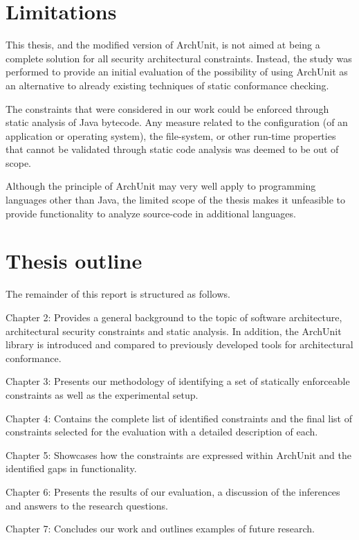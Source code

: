 \section{Limitations}
\label{sec:limitations}

This thesis, and the modified version of ArchUnit, is not aimed at being a complete solution for all security architectural constraints. Instead, the study was performed to provide an initial evaluation of the possibility of using ArchUnit as an alternative to already existing techniques of static conformance checking. 

The constraints that were considered in our work could be enforced through static analysis of Java bytecode. Any measure related to the configuration (of an application or operating system), the file-system, or other run-time properties that cannot be validated through static code analysis was deemed to be out of scope. 

Although the principle of ArchUnit may very well apply to programming languages other than Java, the limited scope of the thesis makes it unfeasible to provide functionality to analyze source-code in additional languages.

\section{Thesis outline}

The remainder of this report is structured as follows.

Chapter 2: Provides a general background to the topic of software architecture, architectural security constraints and static analysis. In addition, the ArchUnit library is introduced and compared to previously developed tools for architectural conformance.  

Chapter 3: Presents our methodology of identifying a set of statically enforceable constraints as well as the experimental setup. 

Chapter 4: Contains the complete list of identified constraints and the final list of constraints selected for the evaluation with a detailed description of each. 

Chapter 5: Showcases how the constraints are expressed within ArchUnit and the identified gaps in functionality.

Chapter 6: Presents the results of our evaluation, a discussion of the inferences and answers to the research questions. 

Chapter 7: Concludes our work and outlines examples of future research.